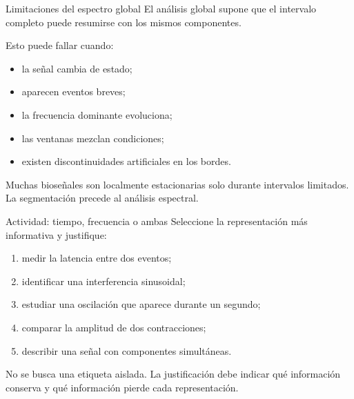 \documentclass[
  ignorenonframetext,
  aspectratio=169,
  spanish,
  professionalfonts]{beamer}
\providecommand{\tightlist}{%
  \setlength{\itemsep}{0pt}\setlength{\parskip}{0pt}}
\begin{document}
\begin{frame}{Limitaciones del espectro global}
\protect{}\label{limitaciones-del-espectro-global}
El análisis global supone que el intervalo completo puede resumirse con
los mismos componentes.

Esto puede fallar cuando:

\begin{itemize}
\tightlist
\item
  la señal cambia de estado;
\item
  aparecen eventos breves;
\item
  la frecuencia dominante evoluciona;
\item
  las ventanas mezclan condiciones;
\item
  existen discontinuidades artificiales en los bordes.
\end{itemize}

\begin{tcolorbox}[enhanced jigsaw, arc=.35mm, bottomrule=.15mm, bottomtitle=1mm, breakable, colback=white, colbacktitle=quarto-callout-caution-color!10!white, colframe=quarto-callout-caution-color-frame, coltitle=black, left=2mm, leftrule=.75mm, opacityback=0, opacitybacktitle=0.6, rightrule=.15mm, title={Señales biomédicas}, titlerule=0mm, toprule=.15mm, toptitle=1mm]

Muchas bioseñales son localmente estacionarias solo durante intervalos
limitados. La segmentación precede al análisis espectral.

\end{tcolorbox}
\end{frame}

\begin{frame}{Actividad: tiempo, frecuencia o ambas}
\protect{}\label{actividad-tiempo-frecuencia-o-ambas}
Seleccione la representación más informativa y justifique:

\begin{enumerate}
\tightlist
\item
  medir la latencia entre dos eventos;
\item
  identificar una interferencia sinusoidal;
\item
  estudiar una oscilación que aparece durante un segundo;
\item
  comparar la amplitud de dos contracciones;
\item
  describir una señal con componentes simultáneas.
\end{enumerate}

\begin{tcolorbox}[enhanced jigsaw, arc=.35mm, bottomrule=.15mm, bottomtitle=1mm, breakable, colback=white, colbacktitle=quarto-callout-note-color!10!white, colframe=quarto-callout-note-color-frame, coltitle=black, left=2mm, leftrule=.75mm, opacityback=0, opacitybacktitle=0.6, rightrule=.15mm, title={Criterio}, titlerule=0mm, toprule=.15mm, toptitle=1mm]

No se busca una etiqueta aislada. La justificación debe indicar qué
información conserva y qué información pierde cada representación.

\end{tcolorbox}
\end{frame}
\end{document}
